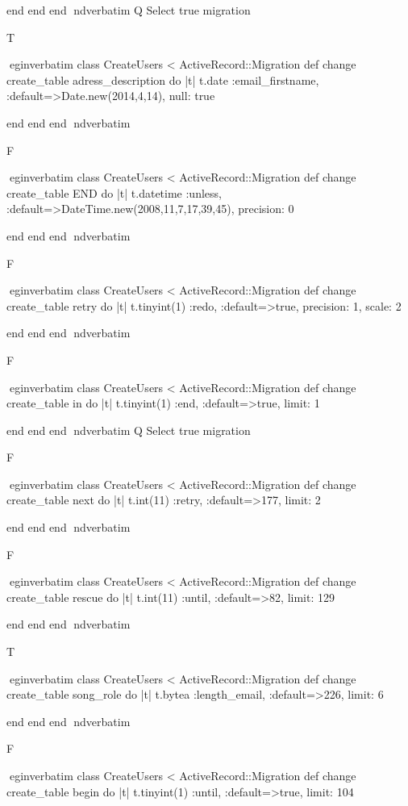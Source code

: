     end 
  end 
end
nd{verbatim}
Q
 Select true migration

T

egin{verbatim}
 class CreateUsers < ActiveRecord::Migration 
  def change 
    create_table adress_description do |t| 
      t.date :email_firstname, :default=>Date.new(2014,4,14), null: true
    
    end 
  end 
end
nd{verbatim}

F

egin{verbatim}
 class CreateUsers < ActiveRecord::Migration 
  def change 
    create_table END do |t| 
      t.datetime :unless, :default=>DateTime.new(2008,11,7,17,39,45), precision: 0
    
    end 
  end 
end
nd{verbatim}

F

egin{verbatim}
 class CreateUsers < ActiveRecord::Migration 
  def change 
    create_table retry do |t| 
      t.tinyint(1) :redo, :default=>true, precision: 1, scale: 2
    
    end 
  end 
end
nd{verbatim}

F

egin{verbatim}
 class CreateUsers < ActiveRecord::Migration 
  def change 
    create_table in do |t| 
      t.tinyint(1) :end, :default=>true, limit: 1
    
    end 
  end 
end
nd{verbatim}
Q
 Select true migration

F

egin{verbatim}
 class CreateUsers < ActiveRecord::Migration 
  def change 
    create_table next do |t| 
      t.int(11) :retry, :default=>177, limit: 2
    
    end 
  end 
end
nd{verbatim}

F

egin{verbatim}
 class CreateUsers < ActiveRecord::Migration 
  def change 
    create_table rescue do |t| 
      t.int(11) :until, :default=>82, limit: 129
    
    end 
  end 
end
nd{verbatim}

T

egin{verbatim}
 class CreateUsers < ActiveRecord::Migration 
  def change 
    create_table song_role do |t| 
      t.bytea :length_email, :default=>226, limit: 6
    
    end 
  end 
end
nd{verbatim}

F

egin{verbatim}
 class CreateUsers < ActiveRecord::Migration 
  def change 
    create_table begin do |t| 
      t.tinyint(1) :until, :default=>true, limit: 104
    
